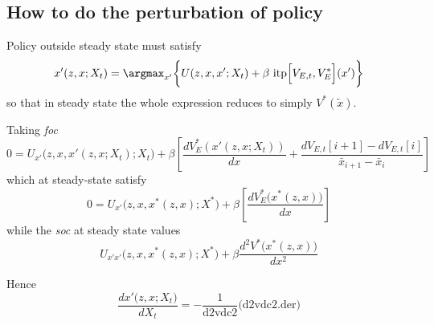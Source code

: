 \documentclass[a4paper,10pt]{article}  %
\begin{document}

\subsection{How to do the perturbation of policy} %
\label{sub:how_to_do_the_perturbation_of_policy}

Policy outside steady state must satisfy
\begin{equation}
   \label{eq:maximization_prob}
   x'(z,x; X_t ) = \argmax_{x'} \bigg\{ U(z,x,x'; X_t) + \beta \  \text{itp} \Big[ V_{E,t} , V_{E}^* \Big]( x' ) \bigg\}
\end{equation}
so that in steady state the whole expression reduces to simply $ V^*( \tilde{x} ) $.

Taking \emph{foc}
\begin{equation}
   \label{eq:foc}
   0 = U_{x'} \Big( z, x, x'(z,x;X_t ); X_t \Big) + \beta 
   \left[
      \frac{ dV_E^*(x'( z,x;X_t) ) }{ dx } + \frac{ dV_{E,t}[ i+1 ] - dV_{E,t}[i] }{ \bar{x}_{i+1} - \bar{x}_{i} }
   \right]  
   \tag{dvdc}
\end{equation}
which at steady-state satisfy
\begin{equation*}
   \label{eq:focstst}
   0 = U_{x'} \Big( z, x, x^*(z,x); X^* \Big) + \beta 
   \left[
      \frac{ dV_E^* \Big(x^*(z,x) \Big) }{ dx }
   \right]  
\end{equation*}
while the \emph{soc} at steady state values
\begin{equation}
   \label{eq:soc}
   U_{x'x'} \Big( z,x, x^*(z,x); X^* \Big) + \beta \frac{d^2V^*\Big( x^*(z,x) \Big)}{dx^2}
   \tag{d2vdc2}
\end{equation}

Hence
\begin{equation}
   \label{eq:}
   \frac{ dx'\Big( z,x; X_t\Big) }{ dX_t } = - \frac{1}{ \text{d2vdc2} } \Big( \text{d2vdc2.der} \Big)
\end{equation}



\clearpage
\newpage
% 
% 

% 
\end{document}
